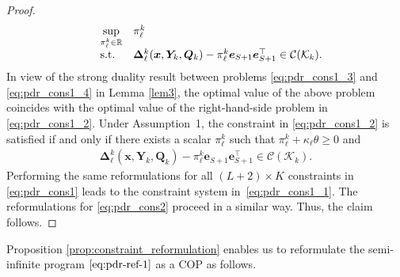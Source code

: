 \documentclass{article}
\newcommand{\st}{\textnormal{s.t.}}
\newcommand{\RR}{\mathbb{R}}
\begin{document}
\begin{proof}
\begin{equation}
\label{eq:pdr_cons1_4}
\begin{array}{clll}
 & \displaystyle \sup_{\pi^k_\ell  \in \RR} & \pi^k_\ell\\
 &\st &  \bm \Delta^k_\ell(\bm x,\bm Y_k,\bm Q_k) - \pi^k_\ell\bm e_{S+1} \bm e_{S+1}^\top 
 \in \mathcal{C} (\mathcal K_k). \\
\end{array}
\end{equation}
In view of the strong duality result between problems \eqref{eq:pdr_cons1_3} and \eqref{eq:pdr_cons1_4} in Lemma \ref{lem3}, the optimal value of the above problem coincides with the optimal value of the right-hand-side problem in \eqref{eq:pdr_cons1_2}. Under Assumption~1, the constraint in  \eqref{eq:pdr_cons1_2} is satisfied if and only if there exists a scalar $\pi_\ell^k$ such that $\pi^k_\ell + \kappa_\ell \theta \geq 0$ and
\begin{equation*}
\begin{array}{clll}
\bm \Delta^k_\ell(\bm x,\bm Y_k,\bm Q_k) - \pi^k_\ell \mathbf{e}_{S+1} \mathbf{e}_{S+1}^\top 
\in \mathcal{C} (\mathcal K_k).
\end{array}
\end{equation*}
Performing the same reformulations for all $(L+2)\times K$ constraints in \eqref{eq:pdr_cons1} leads to the constraint system in~\eqref{eq:pdr_cons1_1}. The reformulations for \eqref{eq:pdr_cons2} proceed in a similar way. Thus, the claim follows. 
\end{proof}
Proposition \ref{prop:constraint_reformulation} enables us to reformulate the semi-infinite program $\eqref{eq:pdr-ref-1}$ as a COP as follows.
\end{document}
